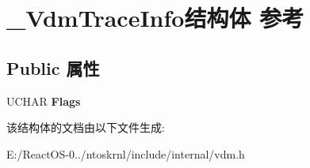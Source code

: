 \hypertarget{struct___vdm_trace_info}{}\section{\+\_\+\+Vdm\+Trace\+Info结构体 参考}
\label{struct___vdm_trace_info}
\subsection*{Public 属性}
\begin{DoxyCompactItemize}
\item 
\mbox{\label{struct___vdm_trace_info_a885ea446328e724d33aa5822a5d4918c}} 
U\+C\+H\+AR {\bfseries Flags}
\end{DoxyCompactItemize}


该结构体的文档由以下文件生成\+:\begin{DoxyCompactItemize}
\item 
E\+:/\+React\+O\+S-\/0../ntoskrnl/include/internal/vdm.\+h\end{DoxyCompactItemize}

